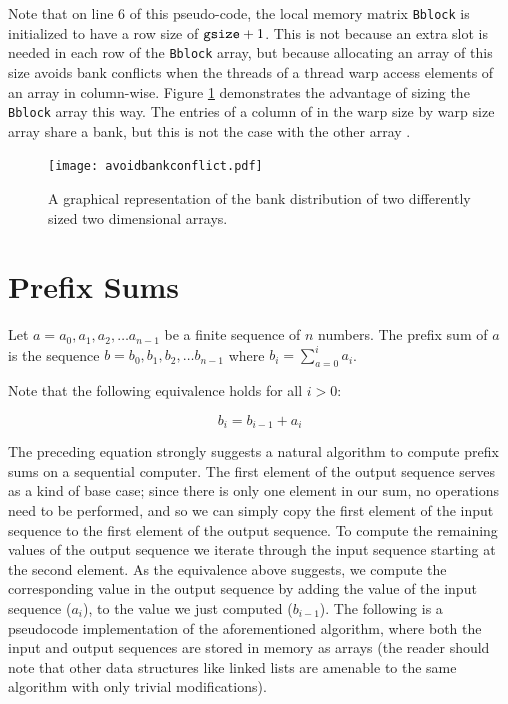 \documentclass[12pt,twoside]{reedthesis}
\newcommand{\var}[1]{{\mbox{\tt#1}}}
\begin{document}
Note that on line 6 of this pseudo-code, the local memory matrix \var{Bblock} is initialized to have a row size of $\var{gsize}+1$. This is not because an extra slot is needed in each row of the \var{Bblock} array, but because allocating an array of this size avoids bank conflicts when the threads of a thread warp access elements of an array in column-wise. Figure \ref{fig:bc} demonstrates the advantage of sizing the \var{Bblock} array this way. The entries of a column of in the warp size by warp size array share a bank, but this is not the case with the other array .

\begin{figure}[h!]
\begin{center}
\texttt{[image: avoidbankconflict.pdf]}
\end{center}
\caption{A graphical representation of the bank distribution of two differently sized two dimensional arrays.}
\label{fig:bc}
\end{figure}
\label{mmd}



\pagebreak

\section{Prefix Sums}
Let $a = a_0, a_1, a_2, \ldots a_{n-1}$ be a finite sequence of $n$ numbers.  The prefix sum of $a$ is the sequence $b = b_0, b_1, b_2, \ldots b_{n-1}$ where $b_i = \sum_{a = 0}^i a_i$.

\vspace{1pc}

Note that the following equivalence holds for all $i > 0$:

$$
b_i = b_{i-1} + a_i
$$

The preceding equation strongly suggests a natural algorithm to compute prefix sums on a sequential computer. The first element of the output sequence serves as a kind of base case; since there is only one element in our sum, no operations need to be performed, and so we can simply copy the first element of the input sequence to the first element of the output sequence.  To compute the remaining values of the output sequence we iterate through the input sequence starting at the second element.  As the equivalence above suggests, we compute the corresponding value in the output sequence by adding the value of the input sequence ($a_i$), to the value we just computed ($b_{i-1}$). The following is a pseudocode implementation of the aforementioned algorithm, where both the input and output sequences are stored in memory as arrays (the reader should note that other data structures like linked lists are amenable to the same algorithm with only trivial modifications).
\end{document}

